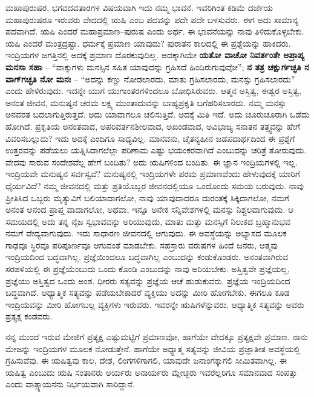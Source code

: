 ಮಹಾಪುರುಷರ, ಭಗವದವತಾರಗಳ ವಿಷಯವಾಗಿ ಇದು ನಮ್ಮ ಭಾವನೆ. ಇವರಿಗಿಂತ ಕಡಿಮೆ ದರ್ಜೆಯ ಮಹಾಪುರುಷರೂ ಇರುವರು ವೇದದಲ್ಲಿ ಋಷಿ ಎಂಬ ಪದವನ್ನು ಪದೇ ಪದೇ ಬಳಸುವರು. ಈಗ ಅದು ಸಾಮಾನ್ಯ ಪದವಾಗಿದೆ. ಋಷಿ ಎಂದರೆ ಮಹಾಪ್ರಮಾಣ–ಪುರುಷ ಎಂದು ಅರ್ಥ. ಈ ಭಾವನೆಯನ್ನು ನಾವು ತಿಳಿದುಕೊಳ್ಳಬೇಕು. ಋಷಿ ಎಂದರೆ ಮಂತ್ರದ್ರಷ್ಟಾ. ಧರ್ಮಕ್ಕೆ ಪ್ರಮಾಣ ಯಾವುದು? ಪುರಾತನ ಕಾಲದಲ್ಲಿ ಈ ಪ್ರಶ್ನೆಯನ್ನು ಹಾಕಿದರು. ಇಂದ್ರಿಯಗಳ ಜಗತ್ತಿನಲ್ಲಿ ಅದಕ್ಕೆ ಪ್ರಮಾಣ ದೊರಕುವುದಿಲ್ಲ. ಅದಕ್ಕಾಗಿಯೇ \textbf{ಯತೋ ವಾಚೋ ನಿವರ್ತಂತೇ ಅಪ್ರಾಪ್ಯ ಮನಸಾ ಸಹಾ} – “ವಾಕ್ಕುಗಳು ಮನಸ್ಸಿನ ಸಹಿತ ಯಾವುದನ್ನು ಗ್ರಹಿಸದೆ ಹಿಂದಿರುಗುವುವೋ”; \textbf{ನ ತತ್ರ ಚಕ್ಷುರ್ಗಚ್ಛತಿ ನ ವಾಗ್​ಗಚ್ಛತಿ ನೋ ಮನಃ} – “ಅದನ್ನು ಕಣ್ಣು ನೋಡಲಾರದು, ಮಾತು ಗ್ರಹಿಸಲಾರದು, ಮನಸ್ಸು ಗ್ರಹಿಸಲಾರದು” ಎಂದು ಹೇಳಿರುವುದು. ಇದನ್ನೇ ಯುಗ ಯುಗಾಂತರಗಳಿಂದಲೂ ಬೋಧಿಸಿರುವರು. ಆತ್ಮನ ಅಸ್ತಿತ್ವ, ಈಶ್ವರ ಅಸ್ತಿತ್ವ, ಅನಂತ ಜೀವನ, ಮನುಷ್ಯನ ಚರಮ ಲಕ್ಷ್ಯ ಮುಂತಾದುವನ್ನು ಬಾಹ್ಯಪ್ರಕೃತಿ ಬಗೆಹರಿಸಲಾರದು. ನಮ್ಮ ಮನಸ್ಸು ಅನವರತ ಬದಲಾಗುತ್ತಿರುತ್ತದೆ. ಅದು ಯಾವಾಗಲೂ ಚಲಿಸುತ್ತಿದೆ. ಅದಕ್ಕೆ ಮಿತಿ ಇದೆ. ಅದು ಚೂರುಚೂರಾಗಿ ಒಡೆದು ಹೋಗಿದೆ. ಪ್ರಕೃತಿಯ ಅನಂತವಾದ, ಅಪರಿವರ್ತನಶೀಲವಾದ, ಅಖಂಡವಾದ, ಅವಿಭಾಜ್ಯ ಸನಾತನ ತತ್ತ್ವವನ್ನು ಹೇಗೆ ವಿವರಿಸ\-ಬಲ್ಲುದು? ಇದು ಅದಕ್ಕೆ ಎಂದಿಗೂ ಸಾಧ್ಯವಿಲ್ಲ. ಮಾನವನು, ಚೈತನ್ಯಹೀನ ಜಡಪದಾರ್ಥದಿಂದ ಈ ಪ್ರಶ್ನೆಗೆ ಉತ್ತರವನ್ನು ಪಡೆಯಲು ಯತ್ನಿಸಿದಾಗಲೆಲ್ಲಾ ಪರಿಣಾಮ ಎಷ್ಟು ಭಯಂಕರವಾಗಿದೆ ಎಂಬುದನ್ನು ಚರಿತ್ರೆ ತೋರುವುದು. ವೇದವು ಸಾರುವ ಸಂದೇಶವೆಲ್ಲ ಹೇಗೆ ಬಂದಿತು? ಅದು ಋಷಿಗಳಿಂದ ಬಂದಿತು. ಈ ಜ್ಞಾನ ಇಂದ್ರಿಯಗಳಲ್ಲಿ ಇಲ್ಲ. ಇಂದ್ರಿಯವೇ ಮನುಷ್ಯನ ಸರ್ವಸ್ವವೆ? ಮನುಷ್ಯನಲ್ಲಿ ಇಂದ್ರಿಯಗಳೇ ಪರಮ ಪ್ರಮಾಣವೆಂದು ಹೇಳುವುದಕ್ಕೆ ಯಾರಿಗೆ ಧೈರ್ಯವಿದೆ? ನಮ್ಮ ಜೀವನದಲ್ಲಿ ಮತ್ತು ಪ್ರತಿಯೊಬ್ಬರ ಜೀವನದಲ್ಲಿಯೂ ಒಂದೊಂದು ಸಮಯ ಬರುವುದು. ನಾವು ಪ್ರೀತಿಸಿದ ಒಬ್ಬರು ಮೃತ್ಯುವಿಗೆ ಬಲಿಯಾದಾಗಲೋ, ನಾವು ಯಾವುದಾದರೂ ದುರಂತಕ್ಕೆ ಸಿಕ್ಕಿ\-ದಾಗಲೋ, ನಮಗೆ ಅನಂತ ಆನಂದ ಪ್ರಾಪ್ತ ವಾದಾಗಲೋ, ಅಥವಾ, ಇನ್ನೂ ಅನೇಕ ಸನ್ನಿವೇಶಗಳಲ್ಲಿ ಮನಸ್ಸು ನಿಶ್ಚಲವಾಗುವುದು. ಆ ಸಮಯದಲ್ಲಿ ಅದು ತನ್ನ ನೈಜ ಸ್ವಭಾವವನ್ನು ಅರಿಯುವುದು, ಮಾತು ಮತ್ತು ಮನಸ್ಸಿಗೆ ನಿಲುಕದ ಬ್ರಹ್ಮಾನುಭವ ನಮಗೆ ವೇದ್ಯವಾಗುವುದು. ಇದು ಸಾಧಾರಣ ಜೀವನದಲ್ಲಿ ಆಗುವುದು. ಈ ಅವಸ್ಥೆಯನ್ನು ಅಭ್ಯಾಸದ ಮೂಲಕ ಗಾಢವೂ ಸ್ಥಿರವೂ ಪರಿಪೂರ್ಣವೂ ಆಗುವಂತೆ ಮಾಡಬೇಕು. ಸಹಸ್ರಾರು ವರುಷಗಳ ಹಿಂದೆ ಜನರು, ಆತ್ಮವು ಇಂದ್ರಿಯದಿಂದ ಬದ್ಧವಾಗಿಲ್ಲ. ಪ್ರಜ್ಞೆಯಿಂದಲೂ  ಬದ್ಧವಾಗಿಲ್ಲ ಎಂಬುದನ್ನು ಕಂಡುಕೊಂಡರು. ಅನಂತವಾಗಿರುವ ಸರಪಳಿಯಲ್ಲಿ ಈ ಪ್ರಜ್ಞೆಯೆಂಬುದು ಒಂದು ಕೊಂಡಿ ಎಂಬುದನ್ನು ನಾವು ಅರಿಯಬೇಕು. ಅಸ್ತಿತ್ವವೇ ಪ್ರಜ್ಞೆಯಲ್ಲ, ಪ್ರಜ್ಞೆಯು ಅಸ್ತಿತ್ವದ ಒಂದು ಅಂಶ. ಧೀರರು ಸತ್ಯವನ್ನು ಪ್ರಜ್ಞೆಯ ಆಚೆ ಹುಡುಕುವರು. ಪ್ರಜ್ಞೆಯ ಇಂದ್ರಿಯದಿಂದ ಬದ್ಧವಾಗಿದೆ. ಆಧ್ಯಾತ್ಮಿಕ ಸತ್ಯವನ್ನು ಪಡೆಯಬೇಕಾದರೆ ವ್ಯಕ್ತಿಯು ಅದನ್ನು ಮೀರಿ ಹೋಗಬೇಕು. ಈಗಲೂ ಕೂಡ ಇಂದ್ರಿಯವನ್ನು ಮೀರಿ ಹೋಗಬಲ್ಲ ವ್ಯಕ್ತಿಗಳು ಇರುವರು. ಇವರನ್ನೇ ಋಷಿಗಳೆನ್ನುವರು. ಆಧ್ಯಾತ್ಮಿಕ ಸತ್ಯವನ್ನು ಅವರು ಪ್ರತ್ಯಕ್ಷ ಕಂಡವರು.

ನನ್ನ ಮುಂದೆ ಇರುವ ಮೇಜಿಗೆ ಪ್ರತ್ಯಕ್ಷ ಎಷ್ಟುಮಟ್ಟಿಗೆ ಪ್ರಮಾಣವೋ, ಹಾಗೆಯೇ ವೇದಕ್ಕೂ ಪ್ರತ್ಯಕ್ಷವೇ ಪ್ರಮಾಣ. ನಾನು ಮೇಜನ್ನು ಇಂದ್ರಿಯಗಳ ಮೂಲಕ ನೋಡುತ್ತೇನೆ. ಹಾಗೆಯೇ ಅಧ್ಯಾತ್ಮ ಸತ್ಯವನ್ನು ಜೀವಿಯ ಪ್ರಜ್ಞಾತೀತ ಅವಸ್ಥೆಯಲ್ಲಿ ಗ್ರಹಿಸುವೆವು. ಈ ಋಷಿತ್ವವು ಕಾಲ, ದೇಶ, ಲಿಂಗಗಳಿಗಾಗಲಿ, ಯಾವುದೇ ಜನಾಂಗಕ್ಕಾಗಲಿ ಸೀಮಿತವಾಗಿಲ್ಲ. ಈ ಋಷಿತ್ವ ಎಂಬುದು ಋಷಿ ಸಂತಾನರು ಆರ್ಯರು ಅನಾರ್ಯರು ಮ್ಲೇಚ್ಛರು ಇವರೆಲ್ಲರಿಗೂ ಸಮಾನವಾದ ಸಂಪತ್ತು ಎಂದು ವಾತ್ಸ್ಯಾಯನನು ನಿರ್ಭಯವಾಗಿ ಸಾರಿದ್ದಾನೆ.

